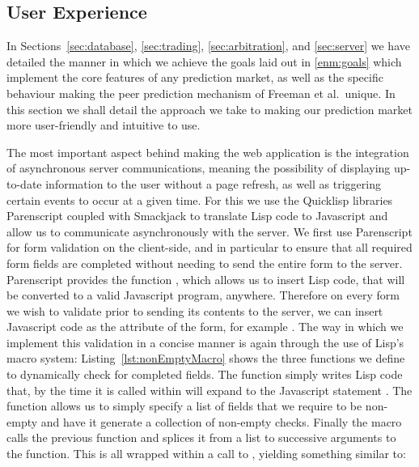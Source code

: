 
\subsection{User Experience}

\label{sec:user-experience}

In Sections~\ref{sec:database}, \ref{sec:trading}, \ref{sec:arbitration}, and
\ref{sec:server} we have detailed the manner in which we achieve the goals laid
out in \ref{enm:goals} which implement the core features of any prediction
market, as well as the specific behaviour making the peer prediction mechanism
of Freeman et al.\ unique. In this section we shall detail the approach we take
to making our prediction market more user-friendly and intuitive to use.

The most important aspect behind making the web application is the
integration of asynchronous server communications, meaning the possibility of
displaying up-to-date information to the user without a page refresh, as well
as triggering certain events to occur at a given time. For this we use the
Quicklisp libraries Parenscript coupled with Smackjack to translate Lisp code
to Javascript and allow us to communicate asynchronously with the server. We
first use Parenscript for form validation on the client-side, and in particular
to ensure that all required form fields are completed without needing to send
the entire form to the server. Parenscript provides the function
, which allows us to insert Lisp code, that will be converted
to a valid Javascript program, anywhere. Therefore on every form we wish to
validate prior to sending its contents to the server, we can insert Javascript
code as the  attribute of the form, for example . The way in
which we implement this validation in a concise manner is again through the use
of Lisp's macro system: Listing~\ref{lst:nonEmptyMacro} shows the three
functions we define to dynamically check for completed fields. The function
 simply writes Lisp code that, by the time it is
called within  will expand to the Javascript statement
. The function  allows us to
simply specify a list of fields that we require to be non-empty and have it
generate a collection of non-empty checks. Finally the macro
 calls the previous function and splices it from a list
to successive arguments to the  function. This is all wrapped within a
call to , yielding something similar to:

